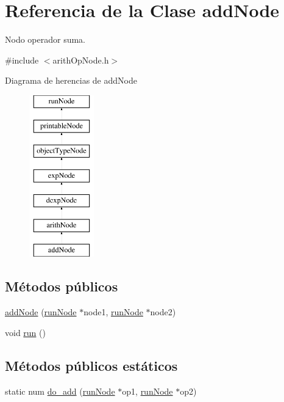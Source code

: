 \hypertarget{classaddNode}{\section{Referencia de la Clase add\-Node}
\label{classaddNode}
}


Nodo operador suma.  




{\ttfamily \#include $<$arith\-Op\-Node.\-h$>$}

Diagrama de herencias de add\-Node\begin{figure}[H]
\begin{center}
\leavevmode
\includegraphics[height=7.000000cm]{classaddNode}
\end{center}
\end{figure}
\subsection*{Métodos públicos}
\begin{DoxyCompactItemize}
\item 
\hyperlink{classaddNode_a738f40ca4256c43bf0b7223b9c264ecb}{add\-Node} (\hyperlink{classrunNode}{run\-Node} $\ast$node1, \hyperlink{classrunNode}{run\-Node} $\ast$node2)
\item 
void \hyperlink{classaddNode_aade4eeee8fc992cc3322ee7f608ce5d2}{run} ()
\end{DoxyCompactItemize}
\subsection*{Métodos públicos estáticos}
\begin{DoxyCompactItemize}
\item 
static num \hyperlink{classaddNode_ae235f633dcf21852d3d9191c6a21fa97}{do\-\_\-add} (\hyperlink{classrunNode}{run\-Node} $\ast$op1, \hyperlink{classrunNode}{run\-Node} $\ast$op2)
\end{DoxyCompactItemize}
